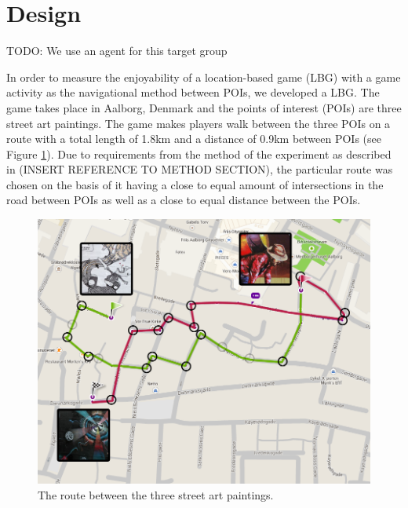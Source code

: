\section{Design}
TODO:
We use an agent for this target group

In order to measure the enjoyability of a location-based game (LBG) with a game activity as the navigational method between POIs, we developed a LBG. The game takes place in Aalborg, Denmark and the points of interest (POIs) are three street art paintings\cite{streetart}. The game makes players walk between the three POIs on a route with a total length of 1.8km and a distance of 0.9km between POIs (see Figure \ref{FinalRoute}). Due to requirements from the method of the experiment as described in (INSERT REFERENCE TO METHOD SECTION), the particular route was chosen on the basis of it having a close to equal amount of intersections in the road between POIs as well as a close to equal distance between the POIs.

\begin{figure}[hbtp]
\centering
\includegraphics[scale=0.3]{Pics/FinalRoute.png}
\caption{The route between the three street art paintings.}
\label{FinalRoute}
\end{figure}

